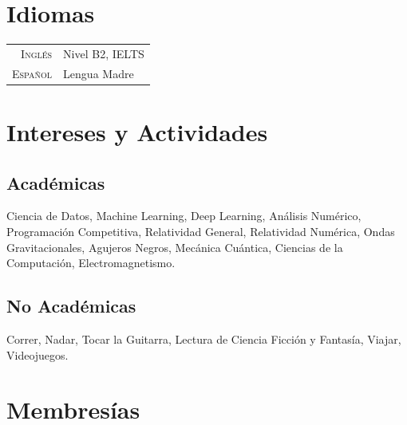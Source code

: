 \documentclass[a4paper,10pt]{article} %
\begin{document}

\section{Idiomas}

\begin{tabular}{rl}
	\textsc{Inglés} & Nivel B2, IELTS\\
	
	\textsc{Español} & Lengua Madre
\end{tabular}


\section{Intereses y Actividades}

\subsection*{Académicas}
Ciencia de Datos, Machine Learning, Deep Learning, Análisis Numérico, Programación Competitiva, Relatividad General, Relatividad Numérica, Ondas Gravitacionales, Agujeros Negros, Mecánica Cuántica, Ciencias de la Computación, Electromagnetismo.
\subsection*{No Académicas}
Correr, Nadar, Tocar la Guitarra, Lectura de Ciencia Ficción y Fantasía, Viajar, Videojuegos. 


\section{Membresías}
\end{document}
